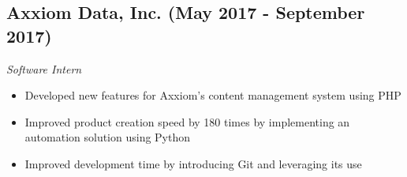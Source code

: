 \documentclass[10pt]{article}
\begin{document}
\subsection{Axxiom Data, Inc. (May 2017 - September 2017)}

\noindent\textit{Software Intern}

\begin{itemize}
	\setlength\itemsep{0em}
	\item Developed new features for Axxiom's content management system using PHP
	\item Improved product creation speed by 180 times by implementing an automation solution using Python
	\item Improved development time by introducing Git and leveraging its use
\end{itemize}

\vfill
\end{document}
